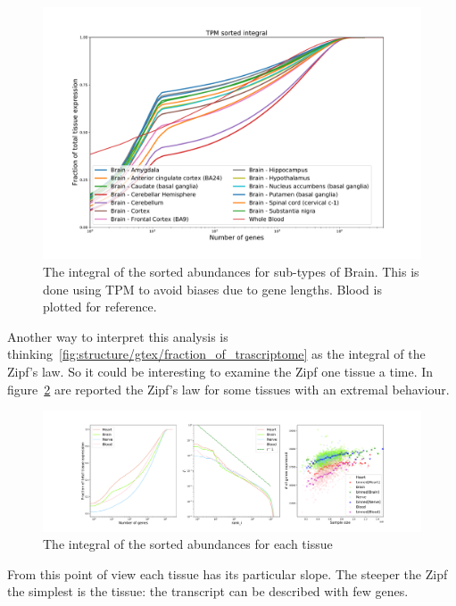 \begin{figure}[htb!]
  \centering
  \includegraphics[width=0.65\linewidth]{pictures/structure/gtex/fraction_of_trascriptome_Brain.pdf}
  \caption{The integral of the sorted abundances for sub-types of Brain. This is done using TPM to avoid biases due to gene lengths. Blood is plotted for reference.}
  \label{fig:structure/gtex/fraction_of_trascriptome_Brain}
\end{figure}

Another way to interpret this analysis is thinking~\ref{fig:structure/gtex/fraction_of_trascriptome} as the integral of the Zipf's law. So it could be interesting to examine the Zipf one tissue a time. In figure~\ref{fig:structure/gtex/zipf_tissue} are reported the Zipf's law for some tissues with an extremal behaviour.
\begin{figure}[htb!]
  \centering
  \includegraphics[width=0.45\linewidth]{pictures/structure/gtex/zipf_tissue.pdf}
  \caption{The integral of the sorted abundances for each tissue}
  \label{fig:structure/gtex/zipf_tissue}
\end{figure}
From this point of view each tissue has its particular slope. The steeper the Zipf the simplest is the tissue: the transcript can be described with few genes.

